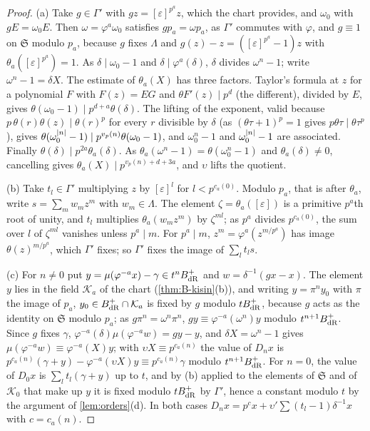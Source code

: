 \begin{proof}
(a) Take $g\in\Gamma'$ with $gz=[\varepsilon]^{p^a}z$, which the chart provides, and $\omega_0$ with $gE=\omega_0E$. Then $\omega=\varphi^a\omega_0$ satisfies $gp_a=\omega p_a$, as $\Gamma'$ commutes with $\varphi$, and $g\equiv1$ on $\mathfrak S$ modulo $p_a$, because $g$ fixes $\Lambda$ and $g(z)-z=([\varepsilon]^{p^a}-1)z$ with
$\theta_a([\varepsilon]^{p^a})=1$. As $\delta\mid\omega_0-1$ and $\delta\mid\varphi^a(\delta)$, $\delta$ divides $\omega^n-1$; write $\omega^n-1=\delta X$. The estimate of $\theta_a(X)$ has three factors. Taylor's formula at $z$ for a polynomial $F$ with $F(z)=EG$ and $\theta F'(z)\mid p^d$ (the different), divided by $E$,
gives $\theta(\omega_0-1)\mid p^{d+a}\theta(\delta)$. The lifting of the exponent, valid because $p\,\theta(r)\theta(z)\mid\theta(r)^p$ for every $r$ divisible by $\delta$ (as $(\theta\tau+1)^p=1$ gives $p\theta\tau\mid\theta\tau^p$), gives $\theta(\omega_0^{\lvert n\rvert}-1)\mid p^{v_p(n)}\theta(\omega_0-1)$, and
$\omega_0^n-1$ and $\omega_0^{\lvert n\rvert}-1$ are associated. Finally $\theta(\delta)\mid p^{2a}\theta_a(\delta)$. As $\theta_a(\omega^n-1)=\theta(\omega_0^n-1)$ and $\theta_a(\delta)\ne0$, cancelling gives $\theta_a(X)\mid p^{v_p(n)+d+3a}$, and $\upsilon$ lifts the quotient.

(b) Take $t_l\in\Gamma'$ multiplying $z$ by $[\varepsilon]^l$ for $l<p^{c_a(0)}$. Modulo $p_a$, that is after $\theta_a$, write $s=\sum_mw_mz^m$ with $w_m\in\Lambda$. The element $\zeta=\theta_a([\varepsilon])$ is a primitive $p^a$th root of unity, and $t_l$ multiplies $\theta_a(w_mz^m)$ by $\zeta^{ml}$; as $p^a$
divides $p^{c_a(0)}$, the sum over $l$ of $\zeta^{ml}$ vanishes unless $p^a\mid m$. For $p^a\mid m$, $z^m=\varphi^a(z^{m/p^a})$ has image $\theta(z)^{m/p^a}$, which $\Gamma'$ fixes; so $\Gamma'$ fixes the image of $\sum_lt_ls$.

(c) For $n\ne0$ put $y=\mu(\varphi^{-a}x)-\gamma\in t^nB_{\rm dR}^+$ and $w=\delta^{-1}(gx-x)$. The element $y$ lies in the field $\mathcal K_a$ of the chart (\cref{thm:B-kisin}(b)), and writing $y=\pi^ny_0$ with $\pi$ the image of $p_a$, $y_0\in B_{\rm dR}^+\cap\mathcal K_a$ is fixed by $g$ modulo $tB_{\rm dR}^+$, because
$g$ acts as the identity on $\mathfrak S$ modulo $p_a$; as $g\pi^n=\omega^n\pi^n$, $gy\equiv\varphi^{-a}(\omega^n)y$ modulo $t^{n+1}B_{\rm dR}^+$. Since $g$ fixes $\gamma$, $\varphi^{-a}(\delta)\mu(\varphi^{-a}w)=gy-y$, and $\delta X=\omega^n-1$ gives $\mu(\varphi^{-a}w)\equiv\varphi^{-a}(X)y$; with
$\upsilon X\equiv p^{c_a(n)}$ the value of $D_nx$ is $p^{c_a(n)}(\gamma+y)-\varphi^{-a}(\upsilon X)y\equiv p^{c_a(n)}\gamma$ modulo $t^{n+1}B_{\rm dR}^+$. For $n=0$, the value of $D_0x$ is $\sum_lt_l(\gamma+y)$ up to $t$, and by (b) applied to the elements of $\mathfrak S$ and of $\mathcal K_0$ that make up $y$ it is
fixed modulo $tB_{\rm dR}^+$ by $\Gamma'$, hence a constant modulo $t$ by the argument of \cref{lem:orders}(d). In both cases $D_nx=p^{c}x+\upsilon'\sum(t_l-1)\delta^{-1}x$ with $c=c_a(n)$.


\end{proof}
